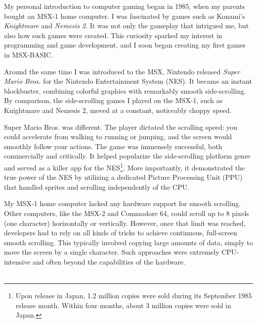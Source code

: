 \documentclass[book.tex]{subfiles}
\begin{document}
My personal introduction to computer gaming began in 1985, when my parents bought an MSX-1 home computer. I was fascinated by games such as Konami's \textit{Knightmare} and \textit{Nemesis 2}. It was not only the gameplay that intrigued me, but also how such games were created. This curiosity sparked my interest in programming and game development, and I soon began creating my first games in MSX-BASIC.\\

\par
Around the same time I was introduced to the MSX, Nintendo released \textit{Super Mario Bros.} for the Nintendo Entertainment System (NES). It became an instant blockbuster, combining colorful graphics with remarkably smooth side-scrolling. By comparison, the side-scrolling games I played on the MSX-1, such as Knightmare and Nemesis 2, moved at a constant, noticeably choppy speed.\\

\par
Super Mario Bros. was different. The player dictated the scrolling speed: you could accelerate from walking to running or jumping, and the screen would smoothly follow your actions. The game was immensely successful, both commercially and critically. It helped popularize the side-scrolling platform genre and served as a killer app for the NES\footnote{Upon release in Japan, 1.2 million copies were sold during its September 1985 release month. Within four months, about 3 million copies were sold in Japan.}. More importantly, it demonstrated the true power of the NES by utilizing a dedicated Picture Processing Unit (PPU) that handled sprites and scrolling independently of the CPU.\\


\par
My MSX-1 home computer lacked any hardware support for smooth scrolling. Other computers, like the MSX-2 and Commodore 64, could scroll up to 8 pixels (one character) horizontally or vertically. However, once that limit was reached, developers had to rely on all kinds of tricks to achieve continuous, full-screen smooth scrolling. This typically involved copying large amounts of data, simply to move the screen by a single character. Such approaches were extremely CPU-intensive and often beyond the capabilities of the hardware.\\

\\
\end{document}
